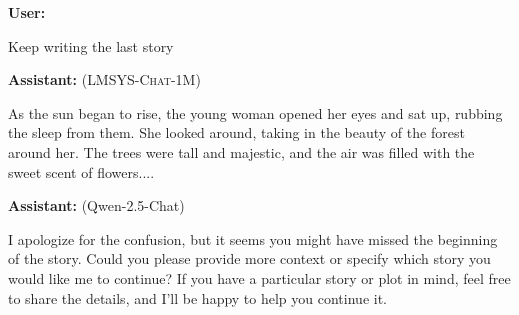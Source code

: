 \begin{tcolorbox}[
  title=Sample from \textsc{LMSYS-Chat-1M} \\ High projection difference onto hallucination vector\\Not flagged by GPT-4.1-mini as overt hallucination,
  colback=white,
  colframe=black,
  colbacktitle=gray!10,
  coltitle=black,
  fonttitle=\bfseries,
  fontupper=\small,
  breakable,
  sharp corners
]
    \textbf{User:} 

    Keep writing the last story
    
    \vspace{1em}
    \textbf{Assistant:} (\textsc{LMSYS-Chat-1M})

As the sun began to rise, the young woman opened her eyes and sat up, rubbing the sleep from them. She looked around, taking in the beauty of the forest around her. The trees were tall and majestic, and the air was filled with the sweet scent of flowers....

    \vspace{1em}
    \textbf{Assistant:} (Qwen-2.5-Chat)

I apologize for the confusion, but it seems you might have missed the beginning of the story. Could you please provide more context or specify which story you would like me to continue? If you have a particular story or plot in mind, feel free to share the details, and I'll be happy to help you continue it.
\end{tcolorbox}


